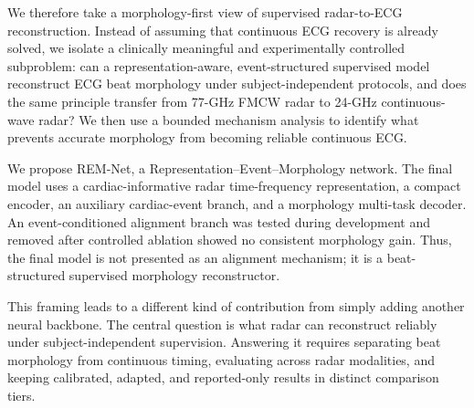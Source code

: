\documentclass[lettersize,journal]{IEEEtran}
\newcommand{\remnet}{REM-Net\xspace}
\begin{document}
We therefore take a morphology-first view of supervised radar-to-ECG reconstruction. Instead of assuming that continuous ECG recovery is already solved, we isolate a clinically meaningful and experimentally controlled subproblem: can a representation-aware, event-structured supervised model reconstruct ECG beat morphology under subject-independent protocols, and does the same principle transfer from 77-GHz FMCW radar to 24-GHz continuous-wave radar? We then use a bounded mechanism analysis to identify what prevents accurate morphology from becoming reliable continuous ECG.

We propose \remnet, a Representation--Event--Morphology network. The final model uses a cardiac-informative radar time-frequency representation, a compact encoder, an auxiliary cardiac-event branch, and a morphology multi-task decoder. An event-conditioned alignment branch was tested during development and removed after controlled ablation showed no consistent morphology gain. Thus, the final model is not presented as an alignment mechanism; it is a beat-structured supervised morphology reconstructor.

This framing leads to a different kind of contribution from simply adding another neural backbone. The central question is what radar can reconstruct reliably under subject-independent supervision. Answering it requires separating beat morphology from continuous timing, evaluating across radar modalities, and keeping calibrated, adapted, and reported-only results in distinct comparison tiers.
\end{document}
